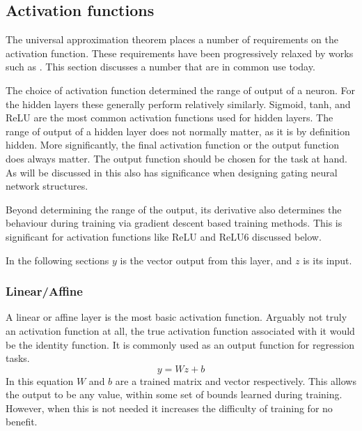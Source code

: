 \documentclass[12pt,parskip]{komatufte}\right
\begin{document}
\subsection{Activation functions}


The universal approximation theorem places a number of requirements on the activation function.
These requirements have been progressively relaxed by works such as \textcite{SONODA2017uat}.
This section discusses a number that are in common use today.

The choice of activation function determined the range of output of a neuron.
For the hidden layers these generally perform relatively similarly.
Sigmoid, tanh, and ReLU are the most common activation functions used for hidden layers.
The range of output of a hidden layer does not normally matter, as it is by definition hidden.
More significantly, the final activation function or the output function does always matter.
The output function should be chosen for the task at hand.
As will be discussed in  this also has significance when designing gating neural network structures.

Beyond determining the range of the output, its derivative also determines the behaviour during training via gradient descent based training methods.
This is significant for activation functions like ReLU and ReLU6 discussed below.


In the following sections $y$ is the vector output from this layer, and $z$ is its input.

\subsubsection{Linear/Affine}
A linear or affine layer is the most basic activation function.
Arguably not truly an activation function at all, the true activation function associated with it would be the identity function.
It is commonly used as an output function for regression tasks.
\begin{equation}
y=Wz + b
\end{equation}
In this equation $W$ and $b$ are a trained matrix and vector respectively.
This allows the output to be any value, within some set of bounds learned during training.
However, when this is not needed it increases the difficulty of training for no benefit.
\end{document}
